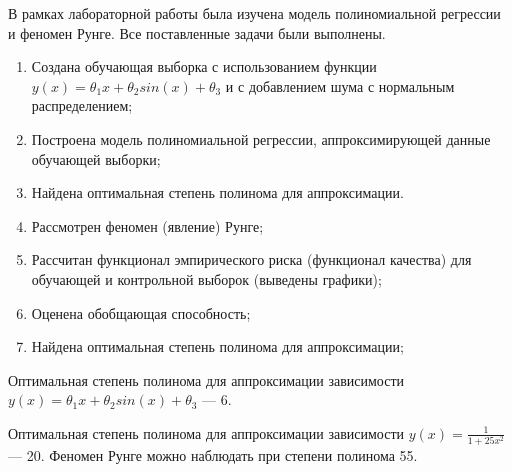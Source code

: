 
В рамках лабораторной работы была изучена модель полиномиальной регрессии и феномен Рунге. Все поставленные задачи были выполнены.

\begin{enumerate}[label*=\arabic*)]
	\item Создана обучающая выборка с использованием функции $y(x)=\theta_1x+\theta_2sin(x)+\theta_3$ и с добавлением шума с нормальным распределением;
	\item Построена модель полиномиальной регрессии, аппроксимирующей данные обучающей выборки;
	\item Найдена оптимальная степень полинома для аппроксимации.
	\item Рассмотрен феномен (явление) Рунге;
	\item Рассчитан функционал эмпирического риска (функционал качества) для обучающей и контрольной выборок (выведены графики);
	\item Оценена обобщающая способность;
	\item Найдена оптимальная степень полинома для аппроксимации;
\end{enumerate}

Оптимальная степень полинома для аппроксимации зависимости $y(x)=\theta_1x+\theta_2sin(x)+\theta_3$  --- 6.

Оптимальная степень полинома для аппроксимации зависимости $y(x)=\frac{1}{1+25x^2}$  --- 20. Феномен Рунге можно наблюдать при степени полинома 55.
